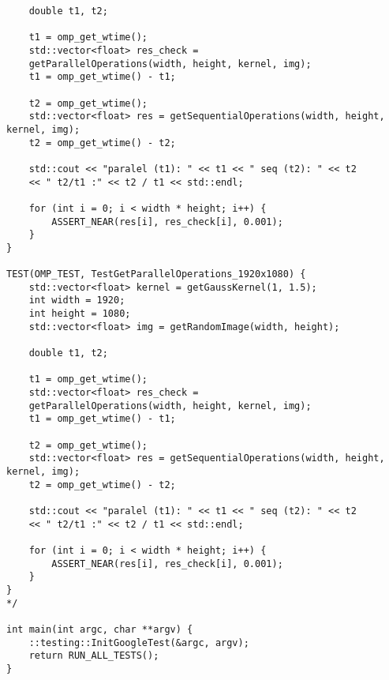 \documentclass{report}
\begin{document}
\begin{lstlisting}
	double t1, t2;
	
	t1 = omp_get_wtime();
	std::vector<float> res_check =
	getParallelOperations(width, height, kernel, img);
	t1 = omp_get_wtime() - t1;
	
	t2 = omp_get_wtime();
	std::vector<float> res = getSequentialOperations(width, height, kernel, img);
	t2 = omp_get_wtime() - t2;
	
	std::cout << "paralel (t1): " << t1 << " seq (t2): " << t2
	<< " t2/t1 :" << t2 / t1 << std::endl;
	
	for (int i = 0; i < width * height; i++) {
		ASSERT_NEAR(res[i], res_check[i], 0.001);
	}
}

TEST(OMP_TEST, TestGetParallelOperations_1920x1080) {
	std::vector<float> kernel = getGaussKernel(1, 1.5);
	int width = 1920;
	int height = 1080;
	std::vector<float> img = getRandomImage(width, height);
	
	double t1, t2;
	
	t1 = omp_get_wtime();
	std::vector<float> res_check =
	getParallelOperations(width, height, kernel, img);
	t1 = omp_get_wtime() - t1;
	
	t2 = omp_get_wtime();
	std::vector<float> res = getSequentialOperations(width, height, kernel, img);
	t2 = omp_get_wtime() - t2;
	
	std::cout << "paralel (t1): " << t1 << " seq (t2): " << t2
	<< " t2/t1 :" << t2 / t1 << std::endl;
	
	for (int i = 0; i < width * height; i++) {
		ASSERT_NEAR(res[i], res_check[i], 0.001);
	}
}
*/

int main(int argc, char **argv) {
	::testing::InitGoogleTest(&argc, argv);
	return RUN_ALL_TESTS();
}

\end{lstlisting}
\end{document}
